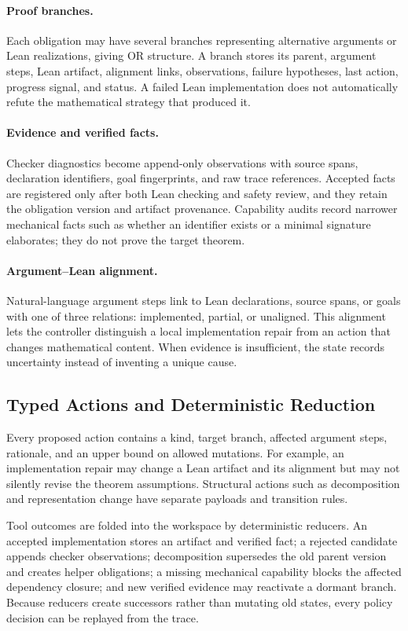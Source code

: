 \paragraph{Proof branches.}
Each obligation may have several branches representing alternative arguments
or Lean realizations, giving OR structure. A branch stores its parent, argument
steps, Lean artifact, alignment links, observations, failure hypotheses, last
action, progress signal, and status. A failed Lean implementation does not
automatically refute the mathematical strategy that produced it.

\paragraph{Evidence and verified facts.}
Checker diagnostics become append-only observations with source spans,
declaration identifiers, goal fingerprints, and raw trace references.
Accepted facts are registered only after both Lean checking and safety review,
and they retain the obligation version and artifact provenance. Capability
audits record narrower mechanical facts such as whether an identifier exists
or a minimal signature elaborates; they do not prove the target theorem.

\paragraph{Argument--Lean alignment.}
Natural-language argument steps link to Lean declarations, source spans, or
goals with one of three relations: implemented, partial, or unaligned. This
alignment lets the controller distinguish a local implementation repair from
an action that changes mathematical content. When evidence is insufficient,
the state records uncertainty instead of inventing a unique cause.

\subsection{Typed Actions and Deterministic Reduction}

Every proposed action contains a kind, target branch, affected argument steps,
rationale, and an upper bound on allowed mutations. For example, an
implementation repair may change a Lean artifact and its alignment but may not
silently revise the theorem assumptions. Structural actions such as
decomposition and representation change have separate payloads and transition
rules.

Tool outcomes are folded into the workspace by deterministic reducers. An
accepted implementation stores an artifact and verified fact; a rejected
candidate appends checker observations; decomposition supersedes the old parent
version and creates helper obligations; a missing mechanical capability blocks
the affected dependency closure; and new verified evidence may reactivate a
dormant branch. Because reducers create successors rather than mutating old
states, every policy decision can be replayed from the trace.

